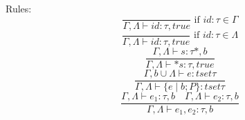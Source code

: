 Rules:
\[
\frac{}{\Gamma,\Lambda \vdash id : \tau,true} \mbox{ if $id:\tau \in \Gamma$}
\]
\[
\frac{}{\Gamma,\Lambda \vdash id : \tau,true} \mbox{ if $id:\tau \in \Lambda$}
\]
\[
\frac{\Gamma,\Lambda\vdash s:\tau*,b}{\Gamma,\Lambda \vdash *s: \tau,true}
\]
\[
\frac{\Gamma,b\cup \Lambda \vdash e: tset \tau}
{\Gamma,\Lambda\vdash \{ e \mid b ; P \} : tset \tau }
\]
\[
\frac{\Gamma,\Lambda\vdash e_1:\tau,b \quad \Gamma,\Lambda\vdash e_2:\tau,b}
{\Gamma,\Lambda\vdash e_1,e_2: \tau,b}
\]

